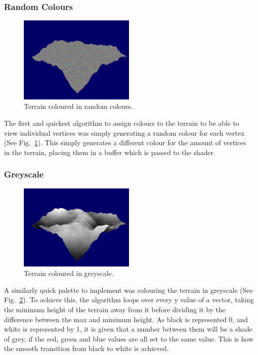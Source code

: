 \documentclass[a4paper,10pt]{report}
\begin{document}
\subsubsection{Random Colours}
\begin{figure}[ht!]
    \centering
  \includegraphics[width=0.5\textwidth]{Images/Screenshots/palette-r.png}
 \caption{Terrain coloured in random colours.}
 \label{fig:palette-r}
\end{figure}

The first and quickest algorithm to assign colours to the terrain to be able to view individual vertices was simply generating a random colour for each vertex (See Fig.~\ref{fig:palette-r}). This simply generates a different colour for the amount of vertices in the terrain, placing them in a buffer which is passed to the shader. 

\subsubsection{Greyscale}
\begin{figure}[ht!]
    \centering
  \includegraphics[width=0.5\textwidth]{Images/Screenshots/palette-g.png}
 \caption{Terrain coloured in greyscale.}
 \label{fig:palette-g}
\end{figure}

A similarly quick palette to implement was colouring the terrain in greyscale (See Fig.~\ref{fig:palette-g}). To achieve this, the algorithm loops over every y value of a vector, taking the minimum height of the terrain away from it before dividing it by the difference between the max and minimum height. As black is represented 0, and white is represented by 1, it is given that a number between them will be a shade of grey, if the red, green and blue values are all set to the same value. This is how the smooth transition from black to white is achieved. 
\end{document}

